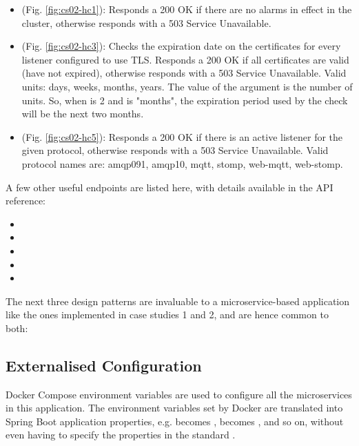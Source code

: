 \begin{itemize}
  \item {} (Fig. \ref{fig:cs02-hc1}): Responds a 200 OK if there are no alarms in effect in the cluster, otherwise responds with a 503 Service Unavailable.
  \item {} (Fig. \ref{fig:cs02-hc3}):  Checks the expiration date on the certificates for every listener configured to use TLS. Responds a 200 OK if all certificates are valid (have not expired), otherwise responds with a 503 Service Unavailable. Valid units: days, weeks, months, years. The value of the  argument is the number of units. So, when  is 2 and  is "months", the expiration period used by the check will be the next two months.
  \item {} (Fig. \ref{fig:cs02-hc5}): Responds a 200 OK if there is an active listener for the given protocol, otherwise responds with a 503 Service Unavailable. Valid protocol names are: amqp091, amqp10, mqtt, stomp, web-mqtt, web-stomp.
\end{itemize}

A few other useful endpoints are listed here, with details available in the API reference:
\begin{itemize}
  \item {}
  \item {}
  \item {}
  \item {}
  \item {}
\end{itemize}


The next three design patterns are invaluable to a microservice-based application like the ones implemented in case studies 1 and 2, and are hence common to both:

\subsection{Externalised Configuration}

Docker Compose environment variables are used to configure all the microservices in this application. The environment variables set by Docker are translated into Spring Boot application properties, e.g.  becomes ,  becomes , and so on, without even having to specify the properties in the standard .

